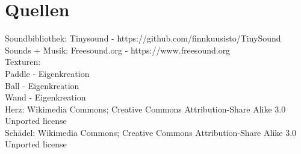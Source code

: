 \section{Quellen}
Soundbibliothek: Tinysound -  https://github.com/finnkuusisto/TinySound\\
Sounds + Musik: Freesound.org - https://www.freesound.org\\
Texturen:\\
Paddle - Eigenkreation\\
Ball - Eigenkreation\\
Wand - Eigenkreation\\
Herz: Wikimedia Commons; Creative Commons Attribution-Share Alike 3.0 Unported license\\
Schädel: Wikimedia Commons; Creative Commons Attribution-Share Alike 3.0 Unported license\\